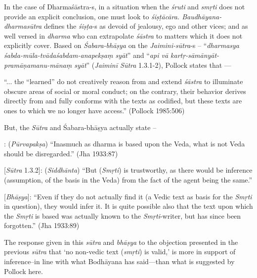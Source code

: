 In the case of Dharmaśāstra-s, in a situation when the {\sl śruti} and {\sl smṛti} does not provide an explicit conclusion, one must look to {\sl śiṣṭācāra. Baudhāyana-dharmasūtra} deﬁnes the {\sl śiṣṭa}-s as devoid of jealousy, ego and other vices; and as well versed in {\sl dharma} who can extrapolate {\sl śāstra} to matters which it does not explicitly cover. Based on {\sl Śabara-bhāṣya} on the {\sl Jaimini-sūtra}-s -- ``{\sl dharmasya śabda-mūla-tvādaśabdam-anapekṣaṃ syāt}''  and ``{\sl api vā kartṛ-sāmānyāt-pramāṇamanu-mānaṃ syāt}'' ({\sl Jaiminī Sūtra} 1.3.1-2), Pollock states that ---
\begin{myquote}
``... the ``learned'' do not creatively reason from and extend {\sl śāstra} to illuminate obscure areas of social or moral conduct; on the contrary, their behavior derives directly from and fully conforms with the texts as codiﬁed, but these texts are ones to which we no longer have access.'' (Pollock 1985:506)
\end{myquote}

But, the {\sl Sūtra} and Śabara-bhāṣya actually state --
\begin{myquote}
[{\sl Sūtra} 1.3.1]: ({\sl Pūrvapakṣa}) ``Inasmuch as dharma is based upon the Veda, what is not Veda should be disregarded.'' (Jha 1933:87)

[{\sl Sūtra} 1.3.2]: ({\sl Siddhānta}) ``But ({\sl Smṛti}) is trustworthy, as there would be inference (assumption, of the basis in the Veda) from the fact of the agent being the same.'' 

[{\sl Bhāṣya}]: ``Even if they do not actually find it (a Vedic text as basis for the {\sl Smṛti} in question), they would infer it. It is quite possible also that the text upon which the {\sl Smṛti} is based was actually known to the {\sl Smṛti}-writer, but has since been forgotten.'' (Jha 1933:89)
\end{myquote}

The response given in this {\sl sūtra} and {\sl bhāṣya} to the objection presented in the previous {\sl sūtra} that `no non-vedic text ({\sl smṛti}) is valid,' is more in support of inference--in line with what Bodhāyana has said---than what is suggested by Pollock here. 

\newpage

